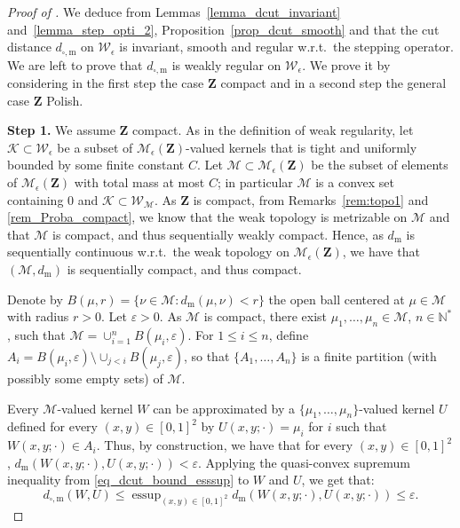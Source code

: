 \documentclass{amsart}
\newcommand{\wrt}{w.r.t.\ }
\theoremstyle{plain}
\theoremstyle{definition}
\newcommand{\Space}{\mathbf{Z}}
\newcommand{\ck}{\mathcal{K}}
\newcommand{\cm}{\mathcal{M}}
\newcommand{\cM}{\mathcal{M}}
\newcommand{\MeasEps}{\mathcal{M}_{\epsilon}(\Space)}
\newcommand{\KernelM}{\mathcal{W}_\cm}
\newcommand{\KernelEps}{\mathcal{W}_{\epsilon}}
\newcommand{\m}{\mathrm{m}}
\newcommand{\dmeas}{d_\m}
\newcommand{\dcut}{d_{\square,\m}}
\newcommand{\N}{\mathbb{N}}
\DeclareMathOperator*{\esssup}{\mathrm{essup}}
\newcommand{\eps}{\varepsilon}
\begin{document}
\begin{proof}[Proof of ]
  We deduce from Lemmas~\ref{lemma_dcut_invariant} and~\ref{lemma_step_opti_2},  Proposition~\ref{prop_dcut_smooth} and
that  the cut distance $\dcut$ 
  on $\KernelEps$ is invariant, smooth and regular \wrt the stepping operator. 
 We  are left to prove  that  $\dcut$  is weakly  regular  on $\KernelEps$. We prove it by considering in the first step the case $\Space$ compact and in a second step the general case $\Space$ Polish. 
 
  \medskip
  
  \textbf{Step 1.} We assume $\Space$ compact.   As in the definition of weak regularity,
let $\ck \subset \KernelEps$ be a subset of $\MeasEps$-valued kernels
  that is tight and uniformly bounded by some finite constant $C$.
Let $\cM\subset\MeasEps$ be the subset of elements of $\MeasEps$ with total mass at most $C$;
	in particular $\cM$ is a convex set containing $0$ 
	and  $\ck\subset \KernelM$. 
As $\Space$ is compact, from Remarks~\ref{rem:topo1} and \ref{rem_Proba_compact},
	we know that the weak topology is metrizable on $\cM$
	and that $\cM$ is compact, and thus sequentially weakly compact. 
Hence, as $\dmeas$ is sequentially continuous \wrt the weak topology on $\MeasEps$,
we  have  that  $(\cM,   \dmeas)$  is sequentially compact, and thus compact.

Denote by $B(\mu,r) = \{ \nu\in\cM  : \dmeas(\mu, \nu) < r  \}$ the open ball
centered at $\mu\in \cM$ with radius $r>0$.
Let    $\eps>0$.     As    $\cM$    is     compact,     there    exist
$\mu_1,   \dots,    \mu_n   \in    \cM$,   $n\in\N^*$,    such   that
$\cM  = \cup_{i=1}^n  B(\mu_i,\eps)$.   For $1\leq  i\leq n$,  define
$A_i  = B(\mu_i,  \eps) \setminus  \cup_{j<i} B(\mu_j,  \eps)$, so  that
$\{A_1,  \ldots,  A_n\}$ is  a  finite  partition (with  possibly  some empty
sets) of $\cM$.

Every $\cM$-valued kernel $W$
can be approximated by a $\{\mu_1, \dots, \mu_n\}$-valued kernel $U$
defined for every $(x,y)\in[0,1]^2$ by 
$U(x,y;\cdot) = \mu_i$ for $i$ such that $W(x,y;\cdot)\in A_i$.
Thus, by construction, we have that for every $(x,y)\in[0,1]^2$, 
$\dmeas(W(x,y;\cdot) , U(x,y;\cdot)) < \eps$.
Applying the quasi-convex supremum inequality from \eqref{eq_dcut_bound_esssup} 
to $W$ and $U$, we get that:
\begin{equation*}
  \dcut(W,U) \leq \esssup_{(x,y)\in [0,1]^2} \dmeas(W(x,y;\cdot) , U(x,y;\cdot)) \leq \eps  .
\end{equation*}


\end{proof}
\end{document}
